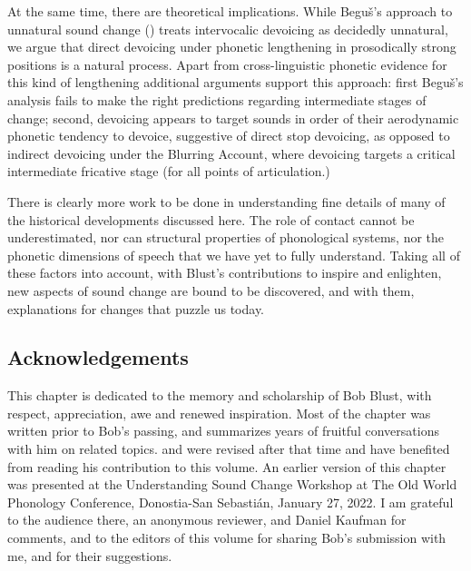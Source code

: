 \documentclass[output=paper]{langscibook}
\begin{document}
At the same time, there are theoretical implications. While Beguš’s approach to unnatural sound change (\citeyear{Beguš2018,Beguš2019}) treats intervocalic devoicing as decidedly unnatural, we argue that direct devoicing under phonetic lengthening in prosodically strong positions is a natural process. Apart from cross-linguistic phonetic evidence for this kind of lengthening additional arguments support this approach: first Beguš’s analysis fails to make the right predictions regarding intermediate stages of change; second, devoicing appears to target sounds in order of their aerodynamic phonetic tendency to devoice, suggestive of direct stop devoicing, as opposed to indirect devoicing under the Blurring Account, where devoicing targets a critical intermediate fricative stage (for all points of articulation.)

There is clearly more work to be done in understanding fine details of many of the historical developments discussed here. The role of contact cannot be underestimated, nor can structural properties of phonological systems, nor the phonetic dimensions of speech that we have yet to fully understand. Taking all of these factors into account, with Blust’s contributions to inspire and enlighten, new aspects of sound change are bound to be discovered, and with them, explanations for changes that puzzle us today.

\subsection*{Acknowledgements}

This chapter is dedicated to the memory and scholarship of Bob Blust, with respect, appreciation, awe and renewed inspiration. Most of the chapter was written prior to Bob’s passing, and summarizes years of fruitful conversations with him on related topics.  and  were revised after that time and have benefited from reading his contribution to this volume. An earlier version of this chapter was presented at the Understanding Sound Change Workshop at The Old World Phonology Conference, Donostia-San Sebastián, January 27, 2022. I am grateful to the audience there, an anonymous reviewer, and Daniel Kaufman for comments, and to the editors of this volume for sharing Bob’s submission with me, and for their suggestions.
\end{document}
